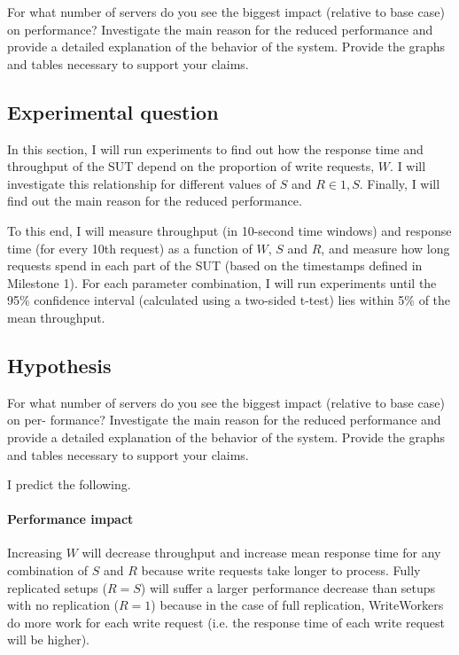 \documentclass[11pt]{article}
\begin{document}
For what number of servers do you see the biggest impact (relative to base case) on performance? Investigate the main reason for the reduced performance and provide a detailed explanation of the behavior of the system. Provide the graphs and tables necessary to support your claims.


\subsection{Experimental question}

In this section, I will run experiments to find out how the response time and throughput of the SUT depend on the proportion of write requests, $W$. I will investigate this relationship for different values of $S$ and $R \in {1, S}$. Finally, I will find out the main reason for the reduced performance.

To this end, I will measure throughput (in 10-second time windows) and response time (for every 10th request) as a function of $W$, $S$ and $R$, and measure how long requests spend in each part of the SUT (based on the timestamps defined in Milestone 1). For each parameter combination, I will run experiments until the 95\% confidence interval (calculated using a two-sided t-test) lies within 5\% of the mean throughput.

\subsection{Hypothesis}

For what number of servers do you see the biggest impact (relative to base case) on per- formance? Investigate the main reason for the reduced performance and provide a detailed explanation of the behavior of the system. Provide the graphs and tables necessary to support your claims.

I predict the following.

\paragraph{Performance impact}
Increasing $W$ will decrease throughput and increase mean response time for any combination of $S$ and $R$ because write requests take longer to process. Fully replicated setups ($R=S$) will suffer a larger performance decrease than setups with no replication ($R=1$) because in the case of full replication, WriteWorkers do more work for each write request (i.e. the response time of each write request will be higher).
\end{document}
